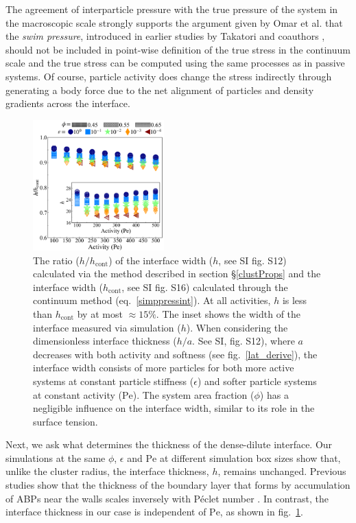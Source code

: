 \documentclass[twoside,twocolumn,9pt]{article}
\begin{document}
The agreement of interparticle pressure with the true pressure of the system in the macroscopic scale strongly supports the argument given by Omar et al. that the \emph{swim pressure}, introduced in earlier studies by Takatori and coauthors \cite{Takatori2014a}, should not be included in point-wise definition of the true stress in the continuum scale and the true stress can be computed using the same processes as in passive systems. 
Of course, particle activity does change the stress indirectly through generating a body force due to the net alignment of particles and density gradients across the interface. 
\begin{figure}[ht!]
\centering
    \includegraphics[width=0.45\textwidth]{figure_9.png}
  \caption{The ratio ($h/h_\text{cont}$) of the interface width ($h$, see SI fig. S12) calculated via the method described in section \S \ref{clustProps} and the interface width ($h_\text{cont}$, see SI fig. S16) calculated through the continuum method (eq.~\ref{simppressint}).  At all activities, $h$ is less than $h_\text{cont}$ by at most $\approx15\%$.  The inset shows the width of the interface measured via simulation ($h$).  When considering the dimensionless interface thickness ($h/a$. See SI, fig. S12), where $a$ decreases with both activity and softness (see fig.~\ref{lat_derive}), the interface width consists of more particles for both more active systems at constant particle stiffness ($\epsilon$) and softer particle systems at constant activity ($\mathrm{Pe}$).  The system area fraction ($\phi$) has a negligible influence on the interface width, similar to its role in the surface tension.}
  \label{intwidth}
\end{figure}

Next, we ask what determines the thickness of the dense-dilute interface. Our simulations at the same $\phi$, $\epsilon$ and $\mathrm{Pe}$ at different simulation box sizes show that, unlike the cluster radius, the interface thickness, $h$, remains unchanged. Previous studies show that the thickness of the boundary layer that forms by accumulation of ABPs near the walls scales inversely with P\'eclet number \cite{Yan2015}. In contrast, the interface thickness in our case is  independent of $\mathrm{Pe}$, as shown in  fig.~\ref{intwidth}.
\end{document}
